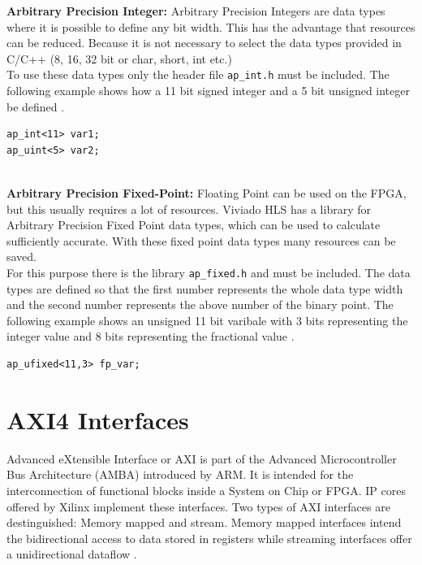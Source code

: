 \textbf{Arbitrary Precision Integer:}
Arbitrary Precision Integers are data types where it is possible to define any bit width. This has the advantage that resources can be reduced. Because it is not necessary to select the data types provided in C/C++ (8, 16, 32 bit or char, short, int etc.) \\
To use these data types only the header file \texttt{ap\_int.h} must be included. The following example shows how a 11 bit signed integer and a 5 bit unsigned integer be defined \cite{ug902}.

\begin{minipage}{\textwidth}
\begin{lstlisting}[style=CStyle]
ap_int<11> var1;
ap_uint<5> var2;
\end{lstlisting}
\end{minipage} \\

\textbf{Arbitrary Precision Fixed-Point:}
Floating Point can be used on the FPGA, but this usually requires a lot of resources. Viviado HLS has a library for Arbitrary Precision Fixed Point data types, which can be used to calculate sufficiently accurate. With these fixed point data types many resources can be saved. \\
For this purpose there is the library \texttt{ap\_fixed.h} and must be included. The data types are defined so that the first number represents the whole data type width and the second number represents the above number of the binary point. The following example shows an unsigned 11 bit varibale with 3 bits representing the integer value and 8 bits representing the fractional value \cite{ug902}. 

\begin{minipage}{\textwidth}
\begin{lstlisting}[style=CStyle]
ap_ufixed<11,3> fp_var;
\end{lstlisting}
\end{minipage}

%
%
\section{AXI4 Interfaces} \label{chapt:theory:axi4interfaces}
Advanced eXtensible Interface or AXI is part of the Advanced Microcontroller Bus
Architecture (AMBA\textregistered) introduced by ARM\textregistered \cite{axispecs}. 
It is intended for the interconnection of functional blocks inside a System on
Chip or FPGA. IP cores offered by Xilinx implement these interfaces. Two types
of AXI interfaces are destinguished: Memory mapped and stream. Memory mapped
interfaces intend the bidirectional access to data stored in registers while
streaming interfaces offer a unidirectional dataflow \cite{axistreamspecs}.

